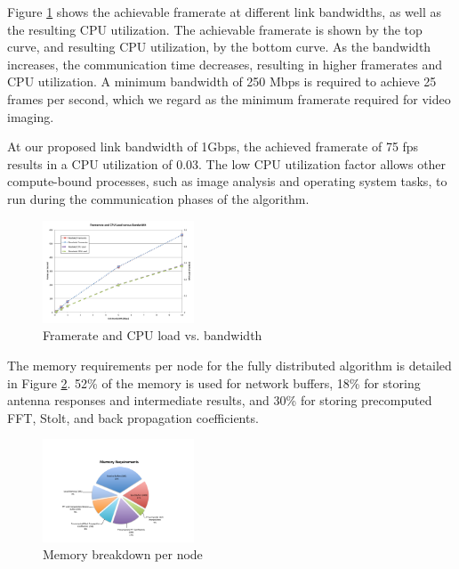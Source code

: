 \documentclass[twocolumn]{article}
\begin{document}
Figure \ref{framerate vs bandwidth} shows the achievable framerate at different link bandwidths, as well as the resulting CPU utilization. The achievable framerate is shown by the top curve, and resulting CPU utilization, by the bottom curve. As the bandwidth increases, the communication time decreases, resulting in higher framerates and CPU utilization. A minimum bandwidth of 250 Mbps is required to achieve 25 frames per second, which we regard as the minimum framerate required for video imaging.

At our proposed link bandwidth of 1Gbps, the achieved framerate of 75 fps results in a CPU utilization of 0.03. The low CPU utilization factor allows other compute-bound processes, such as image analysis and operating system tasks, to run during the communication phases of the algorithm. 

\begin{figure}[!h]
\centering
\includegraphics*[width=0.4\textwidth]{figures/chart10.pdf}
\caption{Framerate and CPU load vs. bandwidth}
\label{framerate vs bandwidth}
\end{figure}

The memory requirements per node for the fully distributed algorithm is detailed in Figure \ref{mem requirements}. 52\% of the memory is used for network buffers, 18\% for storing antenna responses and intermediate results, and 30\% for storing precomputed FFT, Stolt, and back propagation coefficients.

\begin{figure}[!h]
\centering
\includegraphics*[width=0.4\textwidth, viewport = 80 25 540 370]{figures/chart3.pdf}
\caption{Memory breakdown per node}
\label{mem requirements}
\end{figure}
\end{document}
